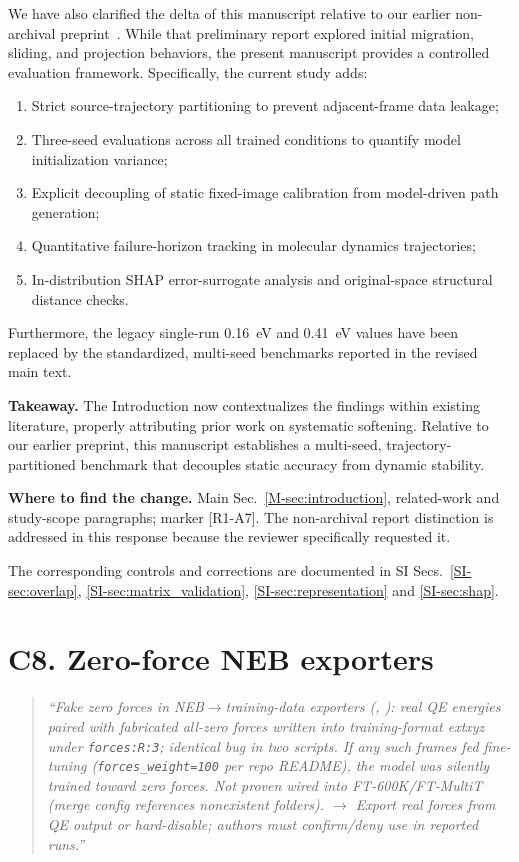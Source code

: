 \documentclass[11pt]{article}
\newcommand{\location}[2]{\par{\small\textbf{Where to find the change.} #1\par #2}\par}
\begin{document}
We have also clarified the delta of this manuscript relative to our earlier non-archival preprint~\citep{cao2025migration}. While that preliminary report explored initial migration, sliding, and projection behaviors, the present manuscript provides a controlled evaluation framework. Specifically, the current study adds:
\begin{enumerate}
    \item Strict source-trajectory partitioning to prevent adjacent-frame data leakage;
    \item Three-seed evaluations across all trained conditions to quantify model initialization variance;
    \item Explicit decoupling of static fixed-image calibration from model-driven path generation;
    \item Quantitative failure-horizon tracking in molecular dynamics trajectories;
    \item In-distribution SHAP error-surrogate analysis and original-space structural distance checks.
\end{enumerate}
Furthermore, the legacy single-run 0.16~eV and 0.41~eV values have been replaced by the standardized, multi-seed benchmarks reported in the revised main text.

\textbf{Takeaway.} The Introduction now contextualizes the findings within existing literature, properly attributing prior work on systematic softening. Relative to our earlier preprint, this manuscript establishes a multi-seed, trajectory-partitioned benchmark that decouples static accuracy from dynamic stability.
\location{Main Sec.~\ref{M-sec:introduction}, related-work and study-scope paragraphs; marker [R1-A7]. The non-archival report distinction is addressed in this response because the reviewer specifically requested it.}{The corresponding controls and corrections are documented in SI Secs.~\ref{SI-sec:overlap}, \ref{SI-sec:matrix_validation}, \ref{SI-sec:representation} and \ref{SI-sec:shap}.}
\section*{C8. Zero-force NEB exporters}

\begin{quote}\small \itshape
``Fake zero forces in NEB$\rightarrow$training-data exporters (, ): real QE energies paired with fabricated all-zero forces written into training-format extxyz under \texttt{forces:R:3}; identical bug in two scripts. If any such frames fed fine-tuning (\texttt{forces\_weight=100} per repo README), the model was silently trained toward zero forces. Not proven wired into FT-600K/FT-MultiT (merge config references nonexistent folders). $\rightarrow$ Export real forces from QE output or hard-disable; authors must confirm/deny use in reported runs.''\end{quote}
\end{document}
